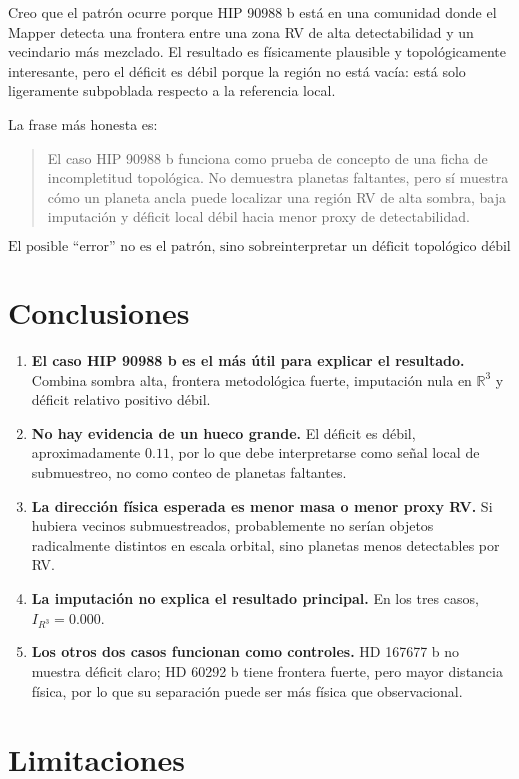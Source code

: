 \documentclass[11pt]{article}
\begin{document}
Creo que el patrón ocurre porque HIP 90988 b está en una comunidad donde el Mapper detecta una frontera entre una zona RV de alta detectabilidad y un vecindario más mezclado. El resultado es físicamente plausible y topológicamente interesante, pero el déficit es débil porque la región no está vacía: está solo ligeramente subpoblada respecto a la referencia local.

La frase más honesta es:

\begin{quote}
El caso HIP 90988 b funciona como prueba de concepto de una ficha de incompletitud topológica. No demuestra planetas faltantes, pero sí muestra cómo un planeta ancla puede localizar una región RV de alta sombra, baja imputación y déficit local débil hacia menor proxy de detectabilidad.
\end{quote}

\[
\boxed{
\text{El posible ``error'' no es el patrón, sino sobreinterpretar un déficit topológico débil como descubrimiento astrofísico.}
}
\]
\section{Conclusiones}

\begin{enumerate}
    \item \textbf{El caso HIP 90988 b es el más útil para explicar el resultado.} Combina sombra alta, frontera metodológica fuerte, imputación nula en $\mathbb{R}^3$ y déficit relativo positivo débil.
    \item \textbf{No hay evidencia de un hueco grande.} El déficit es débil, aproximadamente $0.11$, por lo que debe interpretarse como señal local de submuestreo, no como conteo de planetas faltantes.
    \item \textbf{La dirección física esperada es menor masa o menor proxy RV.} Si hubiera vecinos submuestreados, probablemente no serían objetos radicalmente distintos en escala orbital, sino planetas menos detectables por RV.
    \item \textbf{La imputación no explica el resultado principal.} En los tres casos, $I_{R^3}=0.000$.
    \item \textbf{Los otros dos casos funcionan como controles.} HD 167677 b no muestra déficit claro; HD 60292 b tiene frontera fuerte, pero mayor distancia física, por lo que su separación puede ser más física que observacional.
\end{enumerate}

\section{Limitaciones}
\end{document}
